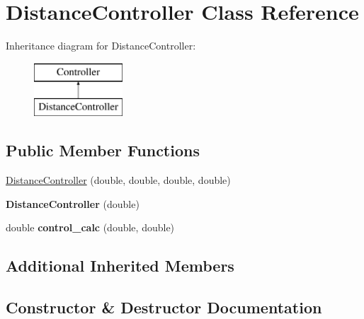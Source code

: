 \hypertarget{class_distance_controller}{}\section{Distance\+Controller Class Reference}
\label{class_distance_controller}
Inheritance diagram for Distance\+Controller\+:\begin{figure}[H]
\begin{center}
\leavevmode
\includegraphics[height=2.000000cm]{class_distance_controller}
\end{center}
\end{figure}
\subsection*{Public Member Functions}
\begin{DoxyCompactItemize}
\item 
\mbox{\hyperlink{class_distance_controller_a5a29d7881e47dcc49ac318fb670e1dc7}{Distance\+Controller}} (double, double, double, double)
\item 
\mbox{\label{class_distance_controller_afc4962a6c184ae191d19aa49c4fd6ab2}} 
{\bfseries Distance\+Controller} (double)
\item 
\mbox{\label{class_distance_controller_a52faa0c6a7ad710ab9f93c01df64fac3}} 
double {\bfseries control\+\_\+calc} (double, double)
\end{DoxyCompactItemize}
\subsection*{Additional Inherited Members}


\subsection{Constructor \& Destructor Documentation}
\mbox{\label{class_distance_controller_a5a29d7881e47dcc49ac318fb670e1dc7}} 

